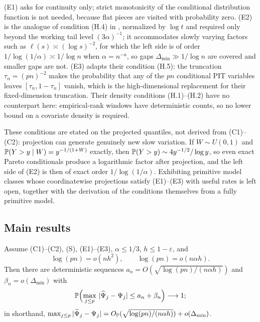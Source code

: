 (E1) asks for continuity only; strict monotonicity of the conditional
distribution function is not needed, because flat pieces are visited with
probability zero. (E2) is the analogue of condition (H.4) in
\citet{gardesPodgorny2025}, normalized by $\log t$ and required only beyond
the working tail level $(3\alpha)^{-1}$; it accommodates slowly varying
factors such as $\ell(s)\asymp(\log s)^{-2}$, for which the left side is of
order $1/\log(1/\alpha)\asymp1/\log n$ when $\alpha=n^{-a}$, so gaps
$\Delta_{\min}\gg1/\log n$ are covered and smaller gaps are not. (E3)
adapts their condition (H.5): the truncation $\tau_n=(pn)^{-2}$ makes the
probability that any of the $pn$ conditional PIT variables leaves
$[\tau_n,1-\tau_n]$ vanish, which is the high-dimensional replacement for
their fixed-dimension truncation. Their density conditions (H.1)--(H.2)
have no counterpart here: empirical-rank windows have deterministic counts,
so no lower bound on a covariate density is required.

These conditions are stated on the projected quantiles, not derived from
(C1)--(C2): projection can generate genuinely new slow variation. If
$W\sim U(0,1)$ and $\mathbb P(Y>y\mid W)=y^{-1/(1+W)}$ exactly, then
$\mathbb P(Y>y)\sim4y^{-1/2}/\log y$, so even exact Pareto conditionals produce
a logarithmic factor after projection, and the left side of (E2) is then
of exact order $1/\log(1/\alpha)$. Exhibiting primitive model classes
whose coordinatewise projections satisfy (E1)--(E3) with useful rates is
left open, together with the derivation of the conditions themselves
from a fully primitive model.

\subsection{Main results}

\begin{theorem}\label{thm:score}
Assume (C1)--(C2), (S), (E1)--(E3), $\alpha\le1/3$,
$h\le1-\varepsilon$, and
\begin{equation}\label{eq:rate-cond}
 \log(pn)=o(nh^2),
 \qquad
 \log(pn)=o(n\alpha h).
\end{equation}
Then there are deterministic sequences
$a_n=O(\sqrt{\log(pn)/(n\alpha h)})$ and $\beta_n=o(\Delta_{\min})$ with
\[
 \mathbb P\Bigl(\max_{j\le p}\,|\widehat\Psi_j-\Psi_j|\le a_n+\beta_n\Bigr)
 \longrightarrow1;
\]
in shorthand,
$\max_{j\le p}|\widehat\Psi_j-\Psi_j|
=O_{\mathbb P}(\sqrt{\log(pn)/(n\alpha h)})+o(\Delta_{\min})$.
\end{theorem}


